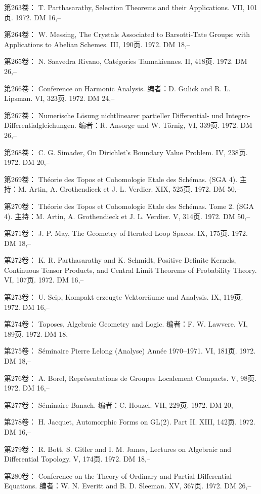 第263卷： T. Parthasarathy, Selection Theorems and their Applications. VII, 101页. 1972. DM 16,--

第264卷： W. Messing, The Crystals Associated to Barsotti-Tate Groups: with Applications to Abelian Schemes. III, 190页. 1972. DM 18,--

第265卷： N. Saavedra Rivano, Catégories Tannakiennes. II, 418页. 1972. DM 26,--

第266卷： Conference on Harmonic Analysis. 编者：D. Gulick and R. L. Lipsman. VI, 323页. 1972. DM 24,--

第267卷： Numerische Lösung nichtlinearer partieller Differential- und Integro-Differentialgleichungen. 编者：R. Ansorge und W. Törnig, VI, 339页. 1972. DM 26,--

第268卷： C. G. Simader, On Dirichlet's Boundary Value Problem. IV, 238页. 1972. DM 20,--

第269卷： Théorie des Topos et Cohomologie Etale des Schémas. (SGA 4). 主持：M. Artin, A. Grothendieck et J. L. Verdier. XIX, 525页. 1972. DM 50,--

第270卷： Théorie des Topos et Cohomologie Etale des Schémas. Tome 2. (SGA 4). 主持：M. Artin, A. Grothendieck et J. L. Verdier. V, 314页. 1972. DM 50,--

第271卷： J. P. May, The Geometry of Iterated Loop Spaces. IX, 175页. 1972. DM 18,--

第272卷： K. R. Parthasarathy and K. Schmidt, Positive Definite Kernels, Continuous Tensor Products, and Central Limit Theorems of Probability Theory. VI, 107页. 1972. DM 16,--

第273卷： U. Seip, Kompakt erzeugte Vektorräume und Analysis. IX, 119页. 1972. DM 16,--

第274卷： Toposes, Algebraic Geometry and Logic. 编者：F. W. Lawvere. VI, 189页. 1972. DM 18,--

第275卷： Séminaire Pierre Lelong (Analyse) Année 1970--1971. VI, 181页. 1972. DM 18,--

第276卷： A. Borel, Représentations de Groupes Localement Compacts. V, 98页. 1972. DM 16,--

第277卷： Séminaire Banach. 编者：C. Houzel. VII, 229页. 1972. DM 20,--

第278卷： H. Jacquet, Automorphic Forms on GL(2). Part II. XIII, 142页. 1972. DM 16,--

第279卷： R. Bott, S. Gitler and I. M. James, Lectures on Algebraic and Differential Topology. V, 174页. 1972. DM 18,--

第280卷： Conference on the Theory of Ordinary and Partial Differential Equations. 编者：W. N. Everitt and B. D. Sleeman. XV, 367页. 1972. DM 26,--

